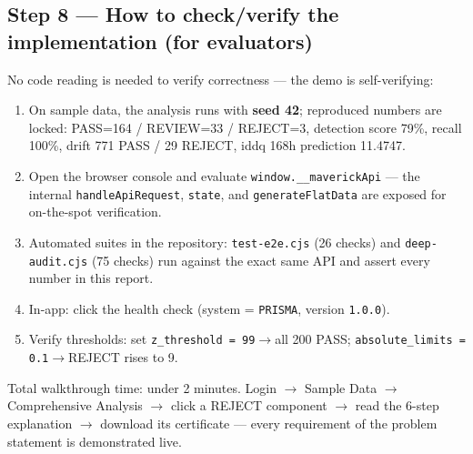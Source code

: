 \documentclass[11pt,a4paper]{article}
\newcommand{\code}[1]{\texttt{\small #1}}
\newcommand{\whatbox}[1]{%
  \par\vspace{0.6em}\noindent
  \begin{tcolorbox}[colback=solgreen!8,colframe=solgreen,
    title={\sffamily\bfseries\color{white}Why PRISMA satisfies the requirements 100\%},arc=2pt,boxrule=1pt]
    #1
  \end{tcolorbox}\par\vspace{0.4em}}
\begin{document}
\subsection*{Step 8 --- How to check/verify the implementation (for evaluators)}
No code reading is needed to verify correctness --- the demo is self-verifying:
\begin{enumerate}[leftmargin=1.5em]
  \item On sample data, the analysis runs with \textbf{seed 42}; reproduced numbers are locked:
        PASS=164 / REVIEW=33 / REJECT=3, detection score 79\%, recall 100\%, drift
        771 PASS / 29 REJECT, iddq 168h prediction 11.4747.
  \item Open the browser console and evaluate \code{window.\_\_maverickApi} --- the internal
        \code{handleApiRequest}, \code{state}, and \code{generateFlatData} are exposed for
        on-the-spot verification.
  \item Automated suites in the repository: \code{test-e2e.cjs} (26 checks) and
        \code{deep-audit.cjs} (75 checks) run against the exact same API and assert every number
        in this report.
  \item In-app: click the health check (system = \code{PRISMA}, version \code{1.0.0}).
  \item Verify thresholds: set \code{z\_threshold = 99}$\rightarrow$all 200 PASS;
        \code{absolute\_limits = 0.1}$\rightarrow$REJECT rises to 9.
\end{enumerate}

\whatbox{Total walkthrough time: under 2 minutes. Login $\rightarrow$ Sample Data
  $\rightarrow$ Comprehensive Analysis $\rightarrow$ click a REJECT component
  $\rightarrow$ read the 6-step explanation $\rightarrow$ download its certificate ---
  every requirement of the problem statement is demonstrated live.}
\end{document}
